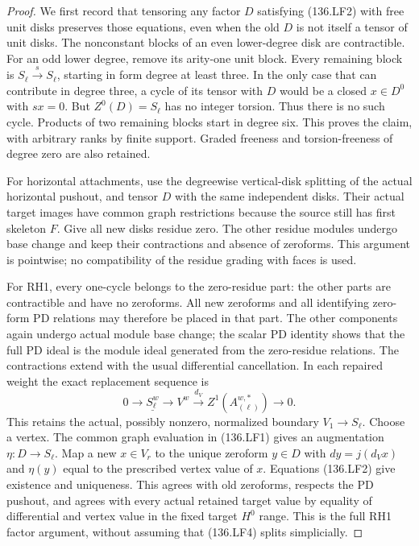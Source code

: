 \begin{proof}
We first record that tensoring any factor \(D\) satisfying
(136.LF2) with free unit disks preserves those equations, even
when the old \(D\) is not itself a tensor of unit disks.
The nonconstant blocks of an even lower-degree disk are
contractible. For an odd lower degree, remove its arity-one
unit block. Every remaining block is
\(S_\ell\xrightarrow{s}S_\ell\), starting in form degree
at least three. In the only case that can contribute in degree
three, a cycle of its tensor with \(D\) would be a closed
\(x\in D^0\) with \(sx=0\). But \(Z^0(D)=S_\ell\)
has no integer torsion. Thus there is no such cycle. Products
of two remaining blocks start in degree six. This proves the
claim, with arbitrary ranks by finite support. Graded freeness
and torsion-freeness of degree zero are also retained.

For horizontal attachments, use the degreewise vertical-disk
splitting of the actual horizontal pushout, and tensor \(D\)
with the same independent disks. Their actual target images
have common graph restrictions because the source still has
first skeleton \(F\). Give all new disks residue zero.
The other residue modules undergo base change and keep their
contractions and absence of zeroforms. This argument is pointwise;
no compatibility of the residue grading with faces is used.

For RH1, every one-cycle belongs to the zero-residue part:
the other parts are contractible and have no zeroforms. All
new zeroforms and all identifying zero-form PD relations may
therefore be placed in that part. The other components again
undergo actual module base change; the scalar PD identity shows
that the full PD ideal is the module ideal generated from the
zero-residue relations. The contractions extend with the usual
differential cancellation. In each repaired weight the exact
replacement sequence is
\[
           0\longrightarrow\underline{S_\ell^w}
             \longrightarrow V^w\xrightarrow{d_V}Z^1(A^{w,*}_{(\ell)})
             \longrightarrow0.                          \tag{136.LF4}
\]
This retains the actual, possibly nonzero, normalized boundary
\(V_1\to S_\ell\). Choose a vertex. The common graph
evaluation in (136.LF1) gives an augmentation \(\eta:D\to S_\ell\).
Map a new \(x\in V_r\) to the unique zeroform \(y\in D\)
with \(dy=j(d_Vx)\) and \(\eta(y)\) equal to the
prescribed vertex value of \(x\). Equations (136.LF2) give
existence and uniqueness. This agrees with old zeroforms, respects
the PD pushout, and agrees with every actual retained target
value by equality of differential and vertex value in the fixed
target \(H^0\) range. This is the full RH1 factor argument,
without assuming that (136.LF4) splits simplicially.


\end{proof}
